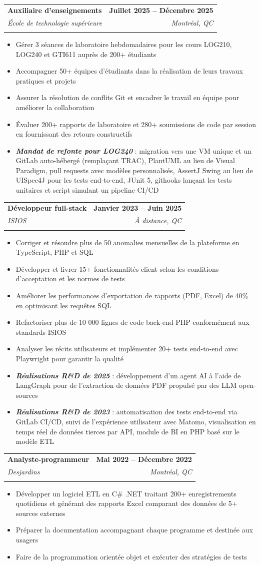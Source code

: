 \documentclass[letterpaper,11pt]{article}
\makeatletter
\newcommand{\resumeItem}[1]{
  \item\small{
    {#1 \vspace{-2pt}}
  }
}
\newcommand{\resumeSubheading}[4]{
  \vspace{-2pt}\item
    \begin{tabular*}{1.0\textwidth}[t]{l@{\extracolsep{\fill}}r}
      \textbf{#1} & \textbf{\small #2} \\
      \if\relax\detokenize{#3}\relax\else
        \textit{\small #3} & \textit{\small #4} \\
      \fi
    \end{tabular*}\vspace{-7pt}
}
\newcommand{\resumeItemListStart}{\begin{itemize}}
\newcommand{\resumeItemListEnd}{\end{itemize}\vspace{-5pt}}
\makeatother
\begin{document}
    \resumeSubheading
      {Auxiliaire d'enseignements}{Juillet 2025 -- Décembre 2025}
      {École de technologie supérieure}{Montréal, QC}
      \resumeItemListStart
        \resumeItem{Gérer 3 séances de laboratoire hebdomadaires pour les cours LOG210, LOG240 et GTI611 auprès de 200+ étudiants}
        \resumeItem{Accompagner 50+ équipes d'étudiants dans la réalisation de leurs travaux pratiques et projets}
        \resumeItem{Assurer la résolution de conflits Git et encadrer le travail en équipe pour améliorer la collaboration}
        \resumeItem{Évaluer 200+ rapports de laboratoire et 280+ soumissions de code par session en fournissant des retours constructifs}
        \resumeItem{\textit{\textbf{Mandat de refonte pour LOG240}} : migration vers une VM unique et un GitLab auto-hébergé (remplaçant TRAC), PlantUML au lieu de Visual Paradigm, pull requests avec modèles personnalisés, AssertJ Swing au lieu de UISpec4J pour les tests end-to-end, JUnit 5, githooks lançant les tests unitaires et script simulant un pipeline CI/CD}
      \resumeItemListEnd

    \resumeSubheading
      {Développeur full-stack}{Janvier 2023 -- Juin 2025}
      {ISIOS}{À distance, QC}
      \resumeItemListStart
        \resumeItem{Corriger et résoudre plus de 50 anomalies mensuelles de la plateforme en TypeScript, PHP et SQL}
        \resumeItem{Développer et livrer 15+ fonctionnalités client selon les conditions d'acceptation et les normes de tests}
        \resumeItem{Améliorer les performances d'exportation de rapports (PDF, Excel) de 40\% en optimisant les requêtes SQL}
        \resumeItem{Refactoriser plus de 10 000 lignes de code back-end PHP conformément aux standards ISIOS}
        \resumeItem{Analyser les récits utilisateurs et implémenter 20+ tests end-to-end avec Playwright pour garantir la qualité}
        \resumeItem{\textit{\textbf{Réalisations R\&D de 2025}} : développement d'un agent AI à l'aide de LangGraph pour de l'extraction de données PDF propulsé par des LLM open-sources}
        \resumeItem{\textit{\textbf{Réalisations R\&D de 2023}} : automatisation des tests end-to-end via GitLab CI/CD, suivi de l'expérience utilisateur avec Matomo, visualisation en temps réel de données tierces par API, module de BI en PHP basé sur le modèle ETL}
      \resumeItemListEnd

    \resumeSubheading
      {Analyste-programmeur}{Mai 2022 -- Décembre 2022}
      {Desjardins}{Montréal, QC}
      \resumeItemListStart
        \resumeItem{Développer un logiciel ETL en C\# .NET traitant 200+ enregistrements quotidiens et générant des rapports Excel comparant des données de 5+ sources externes}
        \resumeItem{Préparer la documentation accompagnant chaque programme et destinée aux usagers}
        \resumeItem{Faire de la programmation orientée objet et exécuter des stratégies de tests}
      \resumeItemListEnd
\end{document}

